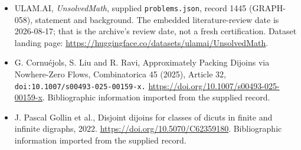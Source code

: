 \documentclass[11pt,a4paper]{article}
\begin{document}
{\small

\begin{itemize}

\item[\hypertarget{source:1445:1}{S1}] ULAM.AI, \emph{UnsolvedMath}, supplied \texttt{problems.json}, record 1445 (GRAPH-058), statement and background. The embedded literature-review date is 2026-08-17; that is the archive’s review date, not a fresh certification. Dataset landing page: \url{https://huggingface.co/datasets/ulamai/UnsolvedMath}.

\item[\hypertarget{source:1445:2}{S2}] G. Cornuéjols, S. Liu and R. Ravi, Approximately Packing Dijoins via Nowhere-Zero Flows, Combinatorica 45 (2025), Article 32, \nolinkurl{doi:10.1007/s00493-025-00159-x.} \url{https://doi.org/10.1007/s00493-025-00159-x}. Bibliographic information imported from the supplied record.

\item[\hypertarget{source:1445:3}{S3}] J. Pascal Gollin et al., Disjoint dijoins for classes of dicuts in finite and infinite digraphs, 2022. \url{https://doi.org/10.5070/C62359180}. Bibliographic information imported from the supplied record.

\end{itemize}

}

\label{end:1445}
\end{document}
